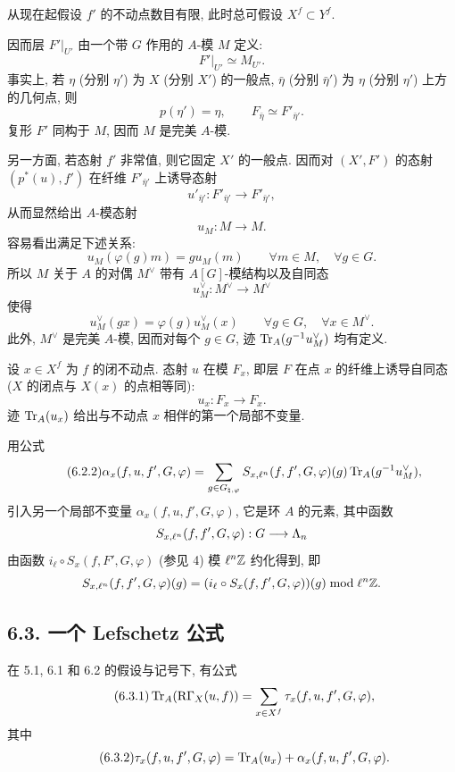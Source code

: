从现在起假设 $f'$ 的不动点数目有限, 此时总可假设 $X^f\subset Y^f$.

因而层 $F'|_{U'}$ 由一个带 $G$ 作用的 $A$-模 $M$ 定义:
\[
F'|_{U'}\simeq M_{U'}.
\]
事实上, 若 $\eta$ (分别 $\eta'$) 为 $X$ (分别 $X'$) 的一般点, $\bar\eta$ (分别 $\bar\eta'$) 为 $\eta$ (分别 $\eta'$) 上方的几何点, 则
\[
p(\eta')=\eta,\qquad F_{\bar\eta}\simeq F'_{\bar\eta'}.
\]
复形 $F'$ 同构于 $M$, 因而 $M$ 是完美 $A$-模.

另一方面, 若态射 $f'$ 非常值, 则它固定 $X'$ 的一般点. 因而对 $(X',F')$ 的态射 $(p^*(u),f')$ 在纤维 $F'_{\bar\eta'}$ 上诱导态射
\[
u'_{\bar\eta'}:F'_{\bar\eta'}\longrightarrow F'_{\bar\eta'},
\]
从而显然给出 $A$-模态射
\[
u_M:M\longrightarrow M.
\]
容易看出满足下述关系:
\begin{equation}\tag{6.2.1}
u_M(\varphi(g)m)=g u_M(m) \qquad \forall m\in M,\quad \forall g\in G.
\end{equation}
所以 $M$ 关于 $A$ 的对偶 $M^\vee$ 带有 $A[G]$-模结构以及自同态
\[
u_M^\vee:M^\vee\longrightarrow M^\vee
\]
使得
\[
u_M^\vee(gx)=\varphi(g)u_M^\vee(x) \qquad \forall g\in G,\quad \forall x\in M^\vee.
\]
此外, $M^\vee$ 是完美 $A$-模, 因而对每个 $g\in G$, 迹 $\operatorname{Tr}_A(g^{-1}u_M^\vee)$ 均有定义.

设 $x\in X^f$ 为 $f$ 的闭不动点. 态射 $u$ 在模 $F_x$, 即层 $F$ 在点 $x$ 的纤维上诱导自同态 ($X$ 的闭点与 $X(x)$ 的点相等同):
\[
u_x:F_x\longrightarrow F_x.
\]
迹 $\operatorname{Tr}_A(u_x)$ 给出与不动点 $x$ 相伴的第一个局部不变量.

用公式
\begin{equation}\tag{6.2.2}
\alpha_x(f,u,f',G,\varphi)=
\sum_{g\in G_{\natural,\varphi}}
S_{x,\ell^n}(f,f',G,\varphi)(g)\operatorname{Tr}_A(g^{-1}u_M^\vee),
\end{equation}
引入另一个局部不变量 $\alpha_x(f,u,f',G,\varphi)$, 它是环 $A$ 的元素, 其中函数
\[
S_{x,\ell^n}(f,f',G,\varphi):G\longrightarrow\Lambda_n
\]
由函数 $i_\ell\circ S_x(f,F',G,\varphi)$ (参见 4) 模 $\ell^n\mathbb Z$ 约化得到, 即
\[
S_{x,\ell^n}(f,f',G,\varphi)(g)=
(i_\ell\circ S_x(f,f',G,\varphi))(g)\bmod \ell^n\mathbb Z.
\]

\subsection*{6.3. 一个 Lefschetz 公式}
在 5.1, 6.1 和 6.2 的假设与记号下, 有公式
\begin{equation}
\tag{6.3.1}
\operatorname{Tr}_A(\mathrm R\Gamma_X(u,f))=\sum_{x\in X^f}\tau_x(f,u,f',G,\varphi),
\end{equation}
其中
\begin{equation}
\tag{6.3.2}
\tau_x(f,u,f',G,\varphi)=\operatorname{Tr}_A(u_x)+\alpha_x(f,u,f',G,\varphi).
\end{equation}

